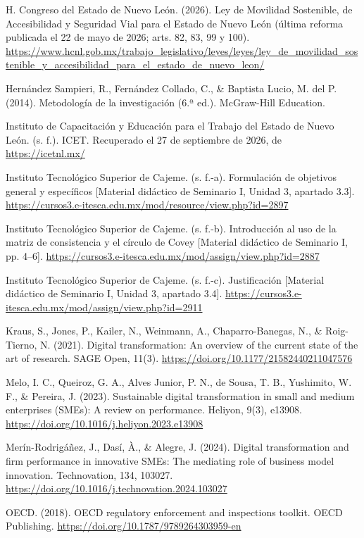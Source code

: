 {H. Congreso del Estado de Nuevo León. (2026). Ley de Movilidad Sostenible, de Accesibilidad y Seguridad Vial para el Estado de Nuevo León (última reforma publicada el 22 de mayo de 2026; arts. 82, 83, 99 y 100). \url{https://www.hcnl.gob.mx/trabajo_legislativo/leyes/leyes/ley_de_movilidad_sostenible_y_accesibilidad_para_el_estado_de_nuevo_leon/}


Hernández Sampieri, R., Fernández Collado, C., \& Baptista Lucio, M. del P. (2014). Metodología de la investigación (6.ª ed.). McGraw-Hill Education.


Instituto de Capacitación y Educación para el Trabajo del Estado de Nuevo León. (s. f.). ICET. Recuperado el 27 de septiembre de 2026, de \url{https://icetnl.mx/}


Instituto Tecnológico Superior de Cajeme. (s. f.-a). Formulación de objetivos general y específicos [Material didáctico de Seminario I, Unidad 3, apartado 3.3]. \url{https://cursos3.e-itesca.edu.mx/mod/resource/view.php?id=2897}


Instituto Tecnológico Superior de Cajeme. (s. f.-b). Introducción al uso de la matriz de consistencia y el círculo de Covey [Material didáctico de Seminario I, pp. 4–6]. \url{https://cursos3.e-itesca.edu.mx/mod/assign/view.php?id=2887}


Instituto Tecnológico Superior de Cajeme. (s. f.-c). Justificación [Material didáctico de Seminario I, Unidad 3, apartado 3.4]. \url{https://cursos3.e-itesca.edu.mx/mod/assign/view.php?id=2911}


Kraus, S., Jones, P., Kailer, N., Weinmann, A., Chaparro-Banegas, N., \& Roig-Tierno, N. (2021). Digital transformation: An overview of the current state of the art of research. SAGE Open, 11(3). \url{https://doi.org/10.1177/21582440211047576}


Melo, I. C., Queiroz, G. A., Alves Junior, P. N., de Sousa, T. B., Yushimito, W. F., \& Pereira, J. (2023). Sustainable digital transformation in small and medium enterprises (SMEs): A review on performance. Heliyon, 9(3), e13908. \url{https://doi.org/10.1016/j.heliyon.2023.e13908}


Merín-Rodrigáñez, J., Dasí, À., \& Alegre, J. (2024). Digital transformation and firm performance in innovative SMEs: The mediating role of business model innovation. Technovation, 134, 103027. \url{https://doi.org/10.1016/j.technovation.2024.103027}


OECD. (2018). OECD regulatory enforcement and inspections toolkit. OECD Publishing. \url{https://doi.org/10.1787/9789264303959-en}


}
